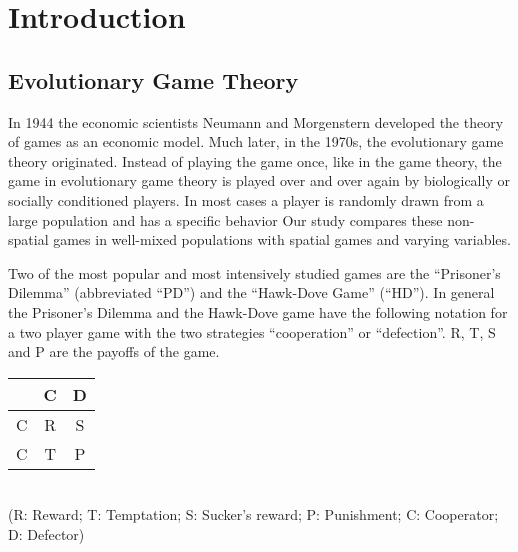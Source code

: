 \section{Introduction}

\subsection{Evolutionary Game Theory}

In 1944 the economic scientists Neumann and Morgenstern \citep{VonNeumann1944} developed the theory of games as an economic model. Much later, in the 1970s, the evolutionary game theory originated. Instead of playing the game once, like in the game theory, the game in evolutionary game theory is played over and over again by biologically or socially conditioned players. In most cases a player is randomly drawn from a large population and has a specific behavior \citep{weibull1997} Our study compares these non-spatial games in well-mixed populations with spatial games and varying variables.

Two of the most popular and most intensively studied games are the ``Prisoner's Dilemma'' \citep{axelrod1981evolution} (abbreviated ``PD'') and the ``Hawk-Dove Game'' \citep{sugden1986economics} (``HD''). In general the Prisoner's Dilemma and the Hawk-Dove game have the following notation for a two player game with the two strategies ``cooperation'' or ``defection''. R, T, S and P are the payoffs of the game.
\newline\\
\begin{tabular}{|c|c|c|}
		\hline  & C & D \\ 
		\hline C & R & S \\ 
		\hline C & T & P \\ 
		\hline 
\end{tabular} \\
(R: Reward; T: Temptation; S: Sucker's reward; P: Punishment; C: Cooperator; D: Defector)


